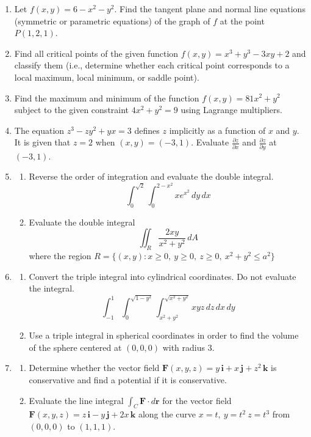 \documentclass[a4paper, 12pt]{article}
\begin{document}
\begin{enumerate}[leftmargin=*,label=\textbf{\arabic*.}]
\item Let $f(x,y)=6-x^2-y^2$. Find the tangent plane and normal line equations (symmetric or parametric equations) of the graph of $f$ at the point $P(1,2,1)$.

\item Find all critical points of the given function $f(x,y)=x^3+y^3-3xy+2$ and classify them (i.e., determine whether each critical point corresponds to a local maximum, local minimum, or saddle point).

\item Find the maximum and minimum of the function $f(x,y)=81x^2+y^2$ subject to the given constraint $4x^2+y^2=9$ using Lagrange multipliers.

\item The equation $z^3-zy^2+yx=3$ defines $z$ implicitly as a function of $x$ and $y$. It is given that $z=2$ when $(x,y)=(-3,1)$. Evaluate $\displaystyle\frac{\partial z}{\partial x}$ and $\displaystyle\frac{\partial z}{\partial y}$ at $(-3,1)$.

\item \begin{enumerate}[leftmargin=*,label=\textbf{\alph*.}]
\item Reverse the order of integration and evaluate the double integral.
\[\int_0^{\sqrt2}\int_0^{2-x^2}x{e}^{x^2}\,dy\,dx\]
 
\item Evaluate the double integral
\[\iint_R \frac{2xy}{x^2+y^2}\,dA\]
where the region $R = \{(x,y): x\geq0,\:y\geq0,\:z\geq0,\:x^2+y^2\leq a^2\}$
\end{enumerate}

\item \begin{enumerate}[leftmargin=*,label=\textbf{\alph*.}]
\item Convert the triple integral into cylindrical coordinates. Do not evaluate the integral.
\[\int_{-1}^1\int_0^{\sqrt{1-y^2}}\int_{x^2+y^2}^{\sqrt{x^2+y^2}}xyz\,dz\,dx\,dy\]

\item Use a triple integral in spherical coordinates in order to find the volume of the sphere centered at $(0,0,0)$ with radius $3$.
\end{enumerate}

\item \begin{enumerate}[leftmargin=*,label=\textbf{\alph*.}]
\item Determine whether the vector field $\mathbf{F}(x,y,z)=y\,\mathbf{i}+x\,\mathbf{j}+z^2\,\mathbf{k}$ is conservative and find a potential if it is conservative.

\item Evaluate the line integral $\int_C\mathbf{F}\cdot d\mathbf{r}$ for the vector field $\mathbf{F}(x,y,z)=z\,\mathbf{i}-y\,\mathbf{j}+2x\,\mathbf{k}$ along the curve $x=t,\:y=t^2\:z=t^3$ from $(0,0,0)$ to $(1,1,1)$.
\end{enumerate}
\end{enumerate}
\end{document}
